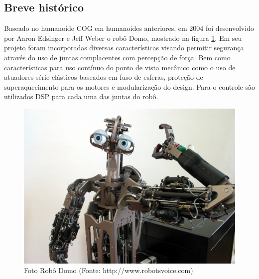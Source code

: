 \subsection{Breve histórico}






Baseado no humanoide COG em humanoides anteriores, em 2004 foi desenvolvido por Aaron Edsinger e Jeff Weber o robô Domo, mostrado na figura \ref{fig:domorobot}. Em seu projeto foram incorporadas diversas características visando permitir segurança através do uso de juntas complacentes com percepção de força. Bem como características para uso contínuo do ponto de vista mecânico como o uso de atuadores série elásticos baseados em fuso de esferas, proteção de superaquecimento para os motores e modularização do design. Para o controle são utilizados DSP para cada uma das juntas do robô\cite{edsinger2004domo}.

\begin{figure}[H]
    \centering
    \includegraphics[width=0.6\linewidth]{tex/figs/domo-foto.jpg}
    \caption{Foto Robô Domo (Fonte: http://www.robotsvoice.com)}
    \label{fig:domorobot}
\end{figure}

